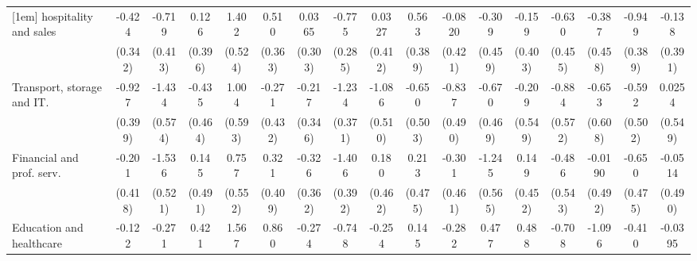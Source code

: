 {\begin{tabular}{l*{16}{c}}
[1em]
hospitality and sales&      -0.424         &      -0.719         &       0.126         &       1.402\sym{**} &       0.510         &      0.0365         &      -0.775\sym{**} &      0.0327         &       0.563         &     -0.0820         &      -0.309         &      -0.159         &      -0.630         &      -0.387         &      -0.949\sym{*}  &      -0.138         \\
                    &     (0.342)         &     (0.413)         &     (0.396)         &     (0.524)         &     (0.363)         &     (0.303)         &     (0.285)         &     (0.412)         &     (0.389)         &     (0.421)         &     (0.459)         &     (0.403)         &     (0.455)         &     (0.458)         &     (0.389)         &     (0.391)         \\
[1em]
Transport, storage and IT.&      -0.927\sym{*}  &      -1.434\sym{*}  &      -0.435         &       1.004         &      -0.271         &      -0.217         &      -1.234\sym{***}&      -1.086\sym{*}  &      -0.650         &      -0.837         &      -0.670         &      -0.209         &      -0.884         &      -0.653         &      -0.592         &      0.0254         \\
                    &     (0.399)         &     (0.574)         &     (0.464)         &     (0.593)         &     (0.432)         &     (0.346)         &     (0.371)         &     (0.510)         &     (0.503)         &     (0.490)         &     (0.469)         &     (0.549)         &     (0.572)         &     (0.608)         &     (0.502)         &     (0.549)         \\
[1em]
Financial and prof. serv.&      -0.201         &      -1.536\sym{**} &       0.145         &       0.757         &       0.321         &      -0.326         &      -1.406\sym{***}&       0.180         &       0.213         &      -0.301         &      -1.245\sym{*}  &       0.149         &      -0.486         &     -0.0190         &      -0.650         &     -0.0514         \\
                    &     (0.418)         &     (0.521)         &     (0.491)         &     (0.552)         &     (0.409)         &     (0.362)         &     (0.392)         &     (0.462)         &     (0.475)         &     (0.461)         &     (0.565)         &     (0.452)         &     (0.543)         &     (0.492)         &     (0.475)         &     (0.490)         \\
[1em]
Education and healthcare&      -0.122         &      -0.271         &       0.421         &       1.567\sym{**} &       0.860\sym{*}  &      -0.274         &      -0.748         &      -0.254         &       0.145         &      -0.282         &       0.477         &       0.488         &      -0.708         &      -1.096\sym{*}  &      -0.410         &     -0.0395         \\

\end{tabular}}
